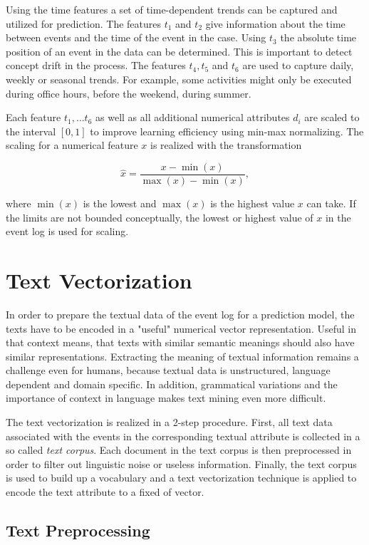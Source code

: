 Using the time features a set of time-dependent trends can be captured and utilized for prediction.
The features $t_1$ and $t_2$ give information about the time between events and the time of the event in the case.
Using $t_3$ the absolute time position of an event in the data can be determined.
This is important to detect concept drift in the process.
The features $t_4, t_5$ and $t_6$ are used to capture daily, weekly or seasonal trends.
For example, some activities might only be executed during office hours, before the weekend, during summer.

Each feature $t_1, \dots t_6$ as well as all additional numerical attributes $d_i$ are scaled to the interval $ [0, 1]$ to improve learning efficiency using min-max normalizing.
The scaling for a numerical feature $x$ is realized with the transformation

$$\hat{x} = \dfrac{x-\min(x)}{\max(x) - \min(x)},$$

where $\min(x)$ is the lowest and $\max(x)$ is the highest value $x$ can take.
If the limits are not bounded conceptually, the lowest or highest value of $x$ in the event log is used for scaling.

\section{Text Vectorization}\label{sec:text}

In order to prepare the textual data of the event log for a prediction model, the texts have to be encoded in a "useful" numerical vector representation.
Useful in that context means, that texts with similar semantic meanings should also have similar representations.
Extracting the meaning of textual information remains a challenge even for humans, because textual data is unstructured, language dependent and domain specific.
In addition, grammatical variations and the importance of context in language makes text mining even more difficult.

The text vectorization is realized in a 2-step procedure.
First, all text data associated with the events in the corresponding textual attribute is collected in a so called \textit{text corpus}.
Each document in the text corpus is then preprocessed in order to filter out linguistic noise or useless information.
Finally, the text corpus is used to build up a vocabulary and a text vectorization technique is applied to encode the text attribute to a fixed of vector.

\subsection{Text Preprocessing}

